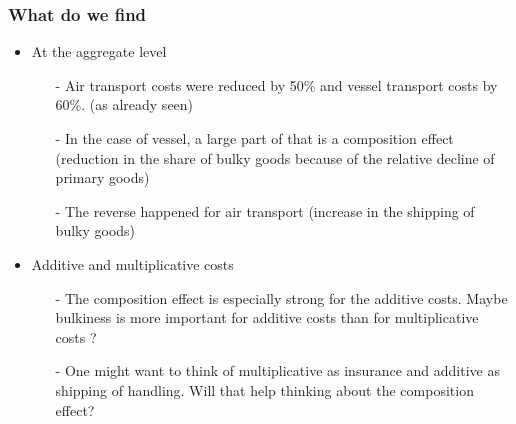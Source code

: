 \documentclass[10 pt,Helvetica, french]{beamer}
\begin{document}
\begin{frame}[label=slide_comment_compositioneffects]
\frametitle{What do we find}
\begin{itemize}
\item At the aggregate level  \vspace{0.1cm}
\begin{itemize}
\item[-] Air transport costs were reduced by 50\% and vessel transport costs by 60\%. (as already seen) \vspace{0.1cm}
\item[-] In the case of vessel, a large part of that is a composition effect (reduction in the share of bulky goods because of the relative decline of primary goods) \vspace{0.1cm}
\item[-] The reverse happened for air transport (increase in the shipping of bulky goods) \vspace{0.1cm}
\end{itemize}
\item Additive and multiplicative costs \vspace{0.1cm}
\begin{itemize}
\item[-] The composition effect is especially strong for the additive costs. Maybe bulkiness is more important for additive costs than for multiplicative costs ? \vspace{0.1cm}
\item[-] One might want to think of multiplicative as insurance and additive as shipping of handling. Will that help thinking about the composition effect? \vspace{0.1cm}
\end{itemize}
\end{itemize}
\end{frame}
\end{document}
